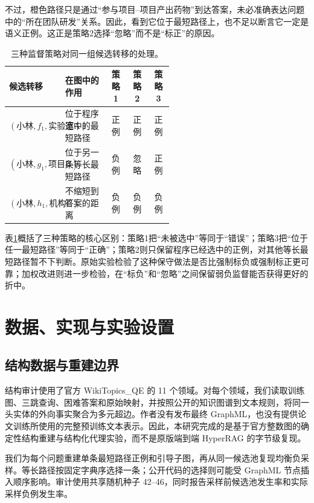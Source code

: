 \documentclass[UTF8,11pt]{ctexart}
\begin{document}
不过，橙色路径只是通过“参与项目--项目产出药物”到达答案，未必准确表达问题中的“所在团队研发”关系。因此，看到它位于最短路径上，也不足以断言它一定是语义正例。这正是策略2选择“忽略”而不是“标正”的原因。

\begin{table}[H]
\centering
\small
\begin{tabular}{p{0.27\linewidth}p{0.27\linewidth}ccc}
\toprule
候选转移 & 在图中的作用 & 策略1 & 策略2 & 策略3 \\
\midrule
$(\text{小林},f_1,\text{实验室A})$ & 位于程序选中的最短路径 & 正例 & 正例 & 正例 \\
$(\text{小林},g_1,\text{项目B})$ & 位于另一条等长最短路径 & 负例 & 忽略 & 正例 \\
$(\text{小林},h_1,\text{机构C})$ & 不缩短到答案的距离 & 负例 & 负例 & 负例 \\
\bottomrule
\end{tabular}
\caption{三种监督策略对同一组候选转移的处理。}
\label{tab:case-labels}
\end{table}

表\ref{tab:case-labels}概括了三种策略的核心区别：策略1把“未被选中”等同于“错误”；策略3把“位于任一最短路径”等同于“正确”；策略2则只保留程序已经选中的正例，对其他等长最短路径暂不下判断。原始实验检验了这种保守做法是否比强制标负或强制标正更可靠；加权改进则进一步检验，在“标负”和“忽略”之间保留弱负监督能否获得更好的折中。

\section{数据、实现与实验设置}

\subsection{结构数据与重建边界}

结构审计使用了官方 WikiTopics\_QE 的 11 个领域。对每个领域，我们读取训练图、三跳查询、困难答案和原始映射，并按照公开的知识图谱到文本规则，将同一头实体的外向事实聚合为多元超边。作者没有发布最终 GraphML，也没有提供论文训练所使用的完整预训练文本表示。因此，本研究完成的是基于官方整数图的确定性结构重建与结构化代理实验，而不是原版端到端 HyperRAG 的字节级复现。

我们为每个问题重建单条最短路径正例和引导子图，再从同一候选池复现均衡负采样。等长路径按固定字典序选择一条；公开代码的选择则可能受 GraphML 节点插入顺序影响。审计使用共享随机种子 42--46，同时报告采样前候选池发生率和实际采样负例发生率。
\end{document}
